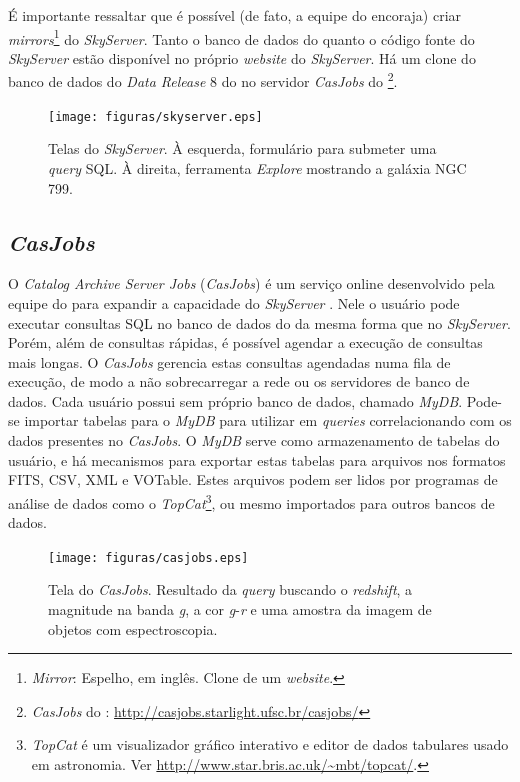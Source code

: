 É importante ressaltar que é possível (de fato, a equipe do \SDSS encoraja)
criar {\em mirrors}\footnote{{\em Mirror}: Espelho, em inglês. Clone de um {\em
website}.} do {\em SkyServer}. Tanto o banco de dados do \SDSS quanto o código
fonte do {\em SkyServer} estão disponível no próprio {\em website} do {\em
SkyServer}. Há um clone do banco de dados do {\em Data Release} 8 do \SDSS no
servidor {\em CasJobs} do \starlight \footnote{{\em CasJobs} do \starlight:
\url{http://casjobs.starlight.ufsc.br/casjobs/}}.

\begin{figure}
	\texttt{[image: figuras/skyserver.eps]}
	\caption[Telas do {\em SkyServer}.]
	{Telas do {\em SkyServer}. À esquerda, formulário para submeter uma {\em
	query} SQL. À direita, ferramenta {\em Explore} mostrando a galáxia NGC 799.}
	\label{fig:TelaDoSkyServer}
\end{figure}

\subsection{{\em CasJobs}}
\label{sec:CrossMatch:SDSS:CasJobs}

O {\em Catalog Archive Server Jobs} ({\em CasJobs}) é um serviço online
desenvolvido pela equipe do \SDSS para expandir a capacidade do {\em SkyServer}
\citep{Li2008}. Nele o usuário pode executar consultas SQL no banco de dados do
\SDSS da mesma forma que no {\em SkyServer}. Porém, além de consultas rápidas, é
possível agendar a execução de consultas mais longas. O {\em CasJobs} gerencia
estas consultas agendadas numa fila de execução, de modo a não sobrecarregar a
rede ou os servidores de banco de dados. Cada usuário possui sem próprio banco
de dados, chamado {\em MyDB}. Pode-se importar tabelas para o {\em MyDB} para
utilizar em {\em queries} correlacionando com os dados presentes no {\em
CasJobs}. O {\em MyDB} serve como armazenamento de tabelas do usuário, e há
mecanismos para exportar estas tabelas para arquivos nos formatos FITS, CSV, XML
e VOTable. Estes arquivos podem ser lidos por programas de análise de dados como
o {\em TopCat}\footnote{{\em TopCat} é um visualizador gráfico interativo e
editor de dados tabulares usado em astronomia. Ver
\url{http://www.star.bris.ac.uk/~mbt/topcat/}.}, ou mesmo importados para outros
bancos de dados.

\begin{figure}
	\texttt{[image: figuras/casjobs.eps]}
	\caption[Tela do {\em CasJobs}.]
	{Tela do {\em CasJobs}. Resultado da {\em query} buscando o {\em redshift}, a
	magnitude na banda {\em g}, a cor {\em g}-{\em r} e uma amostra da imagem de
	objetos com espectroscopia.}
	\label{fig:CasJobs}
\end{figure}

